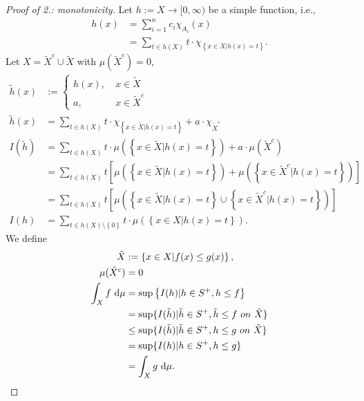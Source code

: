 \documentclass[../../note.tex]{subfiles}
\begin{document}
\begin{proof}[Proof of 2.: monotonicity]
    Let $h:= X \rightarrow [0,\infty)$ be a simple function, i.e.,
    \begin{align}
        h(x) 
        &= \sum_{i=1}^n c_i \chi_{A_i}(x) \\
        &= \sum_{t \in h(X)} t \cdot \chi_{\left\{x \in X \vert h(x) = t \right\}}.
    \end{align}
    Let $X = \tilde{X}^c \cup \tilde{X}$ with $\mu(\tilde{X}^c) = 0$,
    \begin{align}
        \tilde{h}(x)
        &:= \left\{
            \begin{matrix}
                h(x),~&x \in \tilde{X} \\
                a,~&x \in \tilde{X}^c
            \end{matrix}
        \right. \\
        \tilde{h}(x)
        &= \sum_{t \in h(X)} t \cdot \chi_{\left\{x \in \tilde{X} \vert h(x) = t \right\}} + a \cdot \chi_{\tilde{X}^c} \\
        I(\tilde{h})
        &= \sum_{t \in h(X)} t \cdot \mu(\left\{x \in \tilde{X} \vert h(x) = t \right\}) + a \cdot \mu(\tilde{X}^c) \\
        &= \sum_{t \in h(X)} t \left[\mu\left(\left\{x \in \tilde{X} \vert h(x) = t \right\}\right) + \mu \left(\left\{x \in \tilde{X}^c \vert h(x) = t \right\}\right)\right] \\
        &= \sum_{t \in h(X)} t \left[\mu\left(\left\{x \in \tilde{X} \vert h(x) = t \right\} \cup \left\{x \in \tilde{X}^c \vert h(x) = t \right\}\right)\right] \\
        I(h) 
        &= \sum_{t \in h(X) \mbox{\textbackslash} \left\{0\right\}} t \cdot \mu\left(\left\{x \in X \vert h(x) = t \right\}\right). 
    \end{align}
    We define
    \begin{align}
        \tilde{X}
        &:= \left\{x \in X \vert f(x) \leq g(x) \right\}, \\
        \mu(\tilde{X}^c) 
        &= 0 \\
        \int_X f~{\rm d}\mu 
        &= \sup\left\{I(h) \vert h \in S^+, h \leq f \right\} \\
        &= \sup\{I(\tilde{h})\vert \tilde{h} \in S^+, \tilde{h} \leq f ~on~\tilde{X}\} \\
        &\leq \sup\{I(\tilde{h}) \vert \tilde{h} \in S^+, h \leq g ~on~\tilde{X}\} \\
        &= \sup\{I({h}) \vert {h} \in S^+, h \leq g\} \\
        &= \int_X g~{\rm d}\mu.
    \end{align}
\end{proof}
\end{document}
